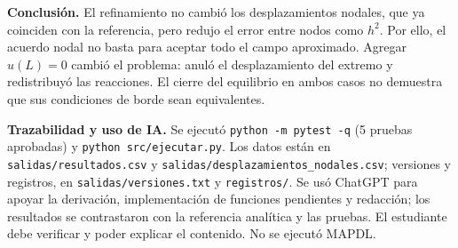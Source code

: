 \documentclass[11pt]{article}
\begin{document}
\textbf{Conclusión.} El refinamiento no cambió los desplazamientos nodales, que ya coinciden con la referencia, pero redujo el error entre nodos como $h^2$. Por ello, el acuerdo nodal no basta para aceptar todo el campo aproximado. Agregar $u(L)=0$ cambió el problema: anuló el desplazamiento del extremo y redistribuyó las reacciones. El cierre del equilibrio en ambos casos no demuestra que sus condiciones de borde sean equivalentes.

\textbf{Trazabilidad y uso de IA.} Se ejecutó \texttt{python -m pytest -q} (5 pruebas aprobadas) y \texttt{python src/ejecutar.py}. Los datos están en \texttt{salidas/resultados.csv} y \texttt{salidas/desplazamientos\_nodales.csv}; versiones y registros, en \texttt{salidas/versiones.txt} y \texttt{registros/}. Se usó ChatGPT para apoyar la derivación, implementación de funciones pendientes y redacción; los resultados se contrastaron con la referencia analítica y las pruebas. El estudiante debe verificar y poder explicar el contenido. No se ejecutó MAPDL.



\end{document}
